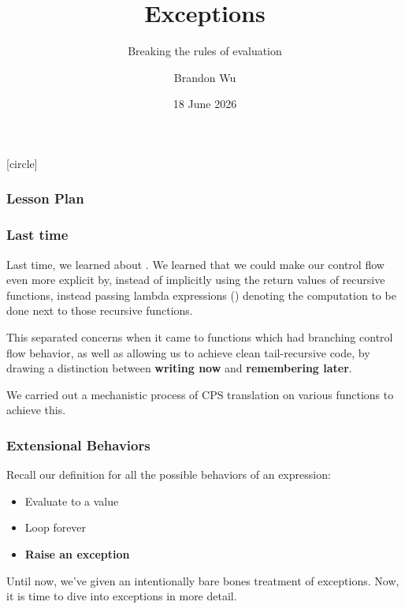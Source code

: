 \documentclass[aspectratio=169]{beamer}
\title{Exceptions} %
\subtitle{Breaking the rules of evaluation} %
\date{18 June 2026} %
\author{Brandon Wu} %
\newif\ifcolorlambda
\begin{document}
\ifweb
    \renewcommand{\pause}{}
\fi

[circle]

{
\begin{frame}[plain]
    \colorlambdatrue
    \titlepage
\end{frame}
}


\begin{frame}[fragile]
  \frametitle{Lesson Plan}

  \tableofcontents
\end{frame}

\begin{frame}[fragile]
  \frametitle{Last time}

  Last time, we learned about . We learned that
  we could make our control flow even more explicit by, instead of implicitly
  using the return values of recursive functions, instead passing lambda expressions
  () denoting the computation to be done next to those recursive functions.

  \pause
  \vspace{\fill}

  This separated concerns when it came to functions which had branching control
  flow behavior, as well as allowing us to achieve clean tail-recursive code,
  by drawing a distinction between \textbf{writing now} and \textbf{remembering later}.

  \pause
  \vspace{\fill}

  We carried out a mechanistic process of CPS translation on various functions to
  achieve this.
\end{frame}


\begin{frame}[fragile]
  \frametitle{Extensional Behaviors}

  Recall our definition for all the possible behaviors of an expression: \pause
  \begin{itemize}
    \item Evaluate to a value \pause
    \item Loop forever \pause
    \item \textbf{Raise an exception}
  \end{itemize}

  \pause
  \vspace{\fill}

  Until now, we've given an intentionally bare bones treatment of
  exceptions. Now, it is time to dive into exceptions in more detail.
\end{frame}
\end{document}
